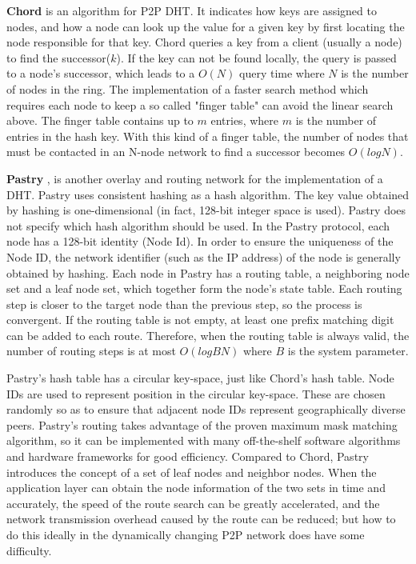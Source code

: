 \textbf{Chord} \cite{stoica2001chord} is an algorithm for P2P DHT. It indicates how keys are assigned to nodes, and how a node can look up the value for a given key by first locating the node responsible for that key. Chord queries a key from a client (usually a node) to find the successor($k$). If the key can not be found locally, the query is passed to a node’s successor, which leads to a $O(N)$ query time where $N$ is the number of nodes in the ring. The implementation of a faster search method which requires each node to keep a so called "finger table" can avoid the linear search above. The finger table contains up to $m$ entries, where $m$ is the number of entries in the hash key. With this kind of a finger table, the number of nodes that must be contacted in an N-node network to find a successor becomes $O(log N)$.

\textbf{Pastry} \cite{rowstron2001pastry}, is another overlay and routing network for the implementation of a DHT. Pastry uses consistent hashing as a hash algorithm. The key value obtained by hashing is one-dimensional (in fact, 128-bit integer space is used). Pastry does not specify which hash algorithm should be used. In the Pastry protocol, each node has a 128-bit identity (Node Id). In order to ensure the uniqueness of the Node ID, the network identifier (such as the IP address) of the node is generally obtained by hashing. Each node in Pastry has a routing table, a neighboring node set and a leaf node set, which together form the node's state table. Each routing step is closer to the target node than the previous step, so the process is convergent. If the routing table is not empty, at least one prefix matching digit can be added to each route. Therefore, when the routing table is always valid, the number of routing steps is at most $O(logBN)$ where $B$ is the system parameter.

Pastry’s hash table has a circular key-space, just like Chord’s hash table. Node IDs are used to represent position in the circular key-space. These are chosen randomly so as to ensure that adjacent node IDs represent geographically diverse peers. Pastry's routing takes advantage of the proven maximum mask matching algorithm, so it can be implemented with many off-the-shelf software algorithms and hardware frameworks for good efficiency. Compared to Chord, Pastry introduces the concept of a set of leaf nodes and neighbor nodes. When the application layer can obtain the node information of the two sets in time and accurately, the speed of the route search can be greatly accelerated, and the network transmission overhead caused by the route can be reduced; but how to do this ideally in the dynamically changing P2P network does have some difficulty.

